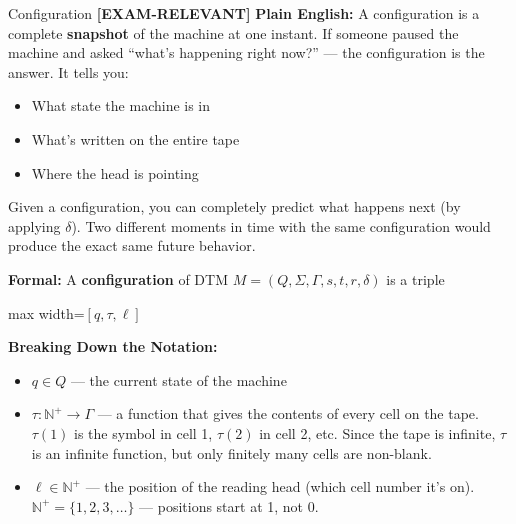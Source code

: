 \documentclass[11pt,a4paper]{article}
\newcommand{\fitmath}[1]{\begin{adjustbox}{max width=\linewidth}$\displaystyle #1$\end{adjustbox}}
\newcommand{\kemark}{\textcolor{red!70!black}{\textbf{[EXAM-RELEVANT]}}}
\begin{document}
\begin{definitionbox}{Configuration \kemark}
\textbf{Plain English:} A configuration is a complete \textbf{snapshot} of the machine at one instant. If someone paused the machine and asked ``what's happening right now?'' --- the configuration is the answer. It tells you:
\begin{itemize}[nosep]
\item What state the machine is in
\item What's written on the entire tape
\item Where the head is pointing
\end{itemize}

Given a configuration, you can completely predict what happens next (by applying $\delta$). Two different moments in time with the same configuration would produce the exact same future behavior.

\textbf{Formal:} A \textbf{configuration} of DTM $M = (Q, \Sigma, \Gamma, s, t, r, \delta)$ is a triple
\fitmath{[q, \tau, \ell]}

\textbf{Breaking Down the Notation:}
\begin{itemize}
\item $q \in Q$ --- the current state of the machine
\item $\tau\colon \mathbb{N}^+ \to \Gamma$ --- a function that gives the contents of every cell on the tape. $\tau(1)$ is the symbol in cell 1, $\tau(2)$ in cell 2, etc. Since the tape is infinite, $\tau$ is an infinite function, but only finitely many cells are non-blank.
\item $\ell \in \mathbb{N}^+$ --- the position of the reading head (which cell number it's on). $\mathbb{N}^+ = \{1, 2, 3, \ldots\}$ --- positions start at 1, not 0.
\end{itemize}
\end{definitionbox}
\end{document}

